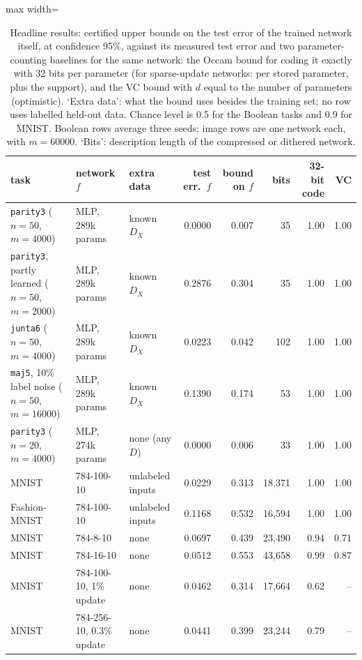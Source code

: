 \begin{table}[t]
\centering\small
\setlength{\tabcolsep}{4pt}
\begin{adjustbox}{max width=\linewidth}\begin{tabular}{l l l r r r r r}
\toprule
task & network $f$ & extra data & test err.\ $f$ & bound on $f$ & bits & 32-bit code & VC \\
\midrule
\texttt{parity3} ($n=50$, $m=4000$) & MLP, 289k params & known $D_X$ & 0.0000 & 0.007 & 35 & 1.00 & 1.00 \\
\texttt{parity3}, partly learned ($n=50$, $m=2000$) & MLP, 289k params & known $D_X$ & 0.2876 & 0.304 & 35 & 1.00 & 1.00 \\
\texttt{junta6} ($n=50$, $m=4000$) & MLP, 289k params & known $D_X$ & 0.0223 & 0.042 & 102 & 1.00 & 1.00 \\
\texttt{maj5}, 10\% label noise ($n=50$, $m=16000$) & MLP, 289k params & known $D_X$ & 0.1390 & 0.174 & 53 & 1.00 & 1.00 \\
\texttt{parity3} ($n=20$, $m=4000$) & MLP, 274k params & none (any $D$) & 0.0000 & 0.006 & 33 & 1.00 & 1.00 \\
MNIST & 784-100-10 & unlabeled inputs & 0.0229 & 0.313 & 18,371 & 1.00 & 1.00 \\
Fashion-MNIST & 784-100-10 & unlabeled inputs & 0.1168 & 0.532 & 16,594 & 1.00 & 1.00 \\
MNIST & 784-8-10 & none & 0.0697 & 0.439 & 23,490 & 0.94 & 0.71 \\
MNIST & 784-16-10 & none & 0.0512 & 0.553 & 43,658 & 0.99 & 0.87 \\
MNIST & 784-100-10, 1\% update & none & 0.0462 & 0.314 & 17,664 & 0.62 & -- \\
MNIST & 784-256-10, 0.3\% update & none & 0.0441 & 0.399 & 23,244 & 0.79 & -- \\
\bottomrule
\end{tabular}\end{adjustbox}
\caption{Headline results: certified upper bounds on the test error of the trained network itself, at confidence 95\%, against its measured test error and two parameter-counting baselines for the same network: the Occam bound for coding it exactly with 32 bits per parameter (for sparse-update networks: per stored parameter, plus the support), and the VC bound with $d$ equal to the number of parameters (optimistic). `Extra data': what the bound uses besides the training set; no row uses labelled held-out data. Chance level is 0.5 for the Boolean tasks and 0.9 for MNIST. Boolean rows average three seeds; image rows are one network each, with $m=60000$. `Bits': description length of the compressed or dithered network.}\label{tab:headline}
\end{table}
